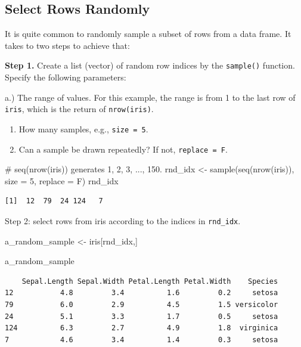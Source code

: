 \documentclass[
  letterpaper,
]{book}
\newenvironment{Shaded}{\begin{snugshade}}{\end{snugshade}}
\newcommand{\AttributeTok}[1]{\textcolor[rgb]{0.40,0.45,0.13}{#1}}
\newcommand{\CommentTok}[1]{\textcolor[rgb]{0.37,0.37,0.37}{#1}}
\newcommand{\DecValTok}[1]{\textcolor[rgb]{0.68,0.00,0.00}{#1}}
\newcommand{\FunctionTok}[1]{\textcolor[rgb]{0.28,0.35,0.67}{#1}}
\newcommand{\NormalTok}[1]{\textcolor[rgb]{0.00,0.23,0.31}{#1}}
\newcommand{\OtherTok}[1]{\textcolor[rgb]{0.00,0.23,0.31}{#1}}
\begin{document}
\subsection{Select Rows Randomly}\label{select-rows-randomly}

It is quite common to randomly sample a subset of rows from a data
frame. It takes to two steps to achieve that:

\textbf{Step 1.} Create a list (vector) of random row indices by the
\texttt{sample()} function. Specify the following parameters:

a.) The range of values. For this example, the range is from 1 to the
last row of \texttt{iris}, which is the return of \texttt{nrow(iris)}.

\begin{enumerate}
\def\labelenumi{\alph{enumi})}
\setcounter{enumi}{1}
\item
  How many samples, e.g., \texttt{size\ =\ 5}.
\item
  Can a sample be drawn repeatedly? If not, \texttt{replace\ =\ F}.
\end{enumerate}

\begin{Shaded}
\begin{Highlighting}[]
\CommentTok{\# seq(nrow(iris)) generates 1, 2, 3, ..., 150.}
\NormalTok{rnd\_idx }\OtherTok{\textless{}{-}} \FunctionTok{sample}\NormalTok{(}\FunctionTok{seq}\NormalTok{(}\FunctionTok{nrow}\NormalTok{(iris)), }\AttributeTok{size =} \DecValTok{5}\NormalTok{, }\AttributeTok{replace =}\NormalTok{ F)}
\NormalTok{rnd\_idx}
\end{Highlighting}
\end{Shaded}

\begin{verbatim}
[1]  12  79  24 124   7
\end{verbatim}

Step 2: select rows from iris according to the indices in
\texttt{rnd\_idx}.

\begin{Shaded}
\begin{Highlighting}[]
\NormalTok{a\_random\_sample }\OtherTok{\textless{}{-}}\NormalTok{ iris[rnd\_idx,]}

\NormalTok{a\_random\_sample}
\end{Highlighting}
\end{Shaded}

\begin{verbatim}
    Sepal.Length Sepal.Width Petal.Length Petal.Width    Species
12           4.8         3.4          1.6         0.2     setosa
79           6.0         2.9          4.5         1.5 versicolor
24           5.1         3.3          1.7         0.5     setosa
124          6.3         2.7          4.9         1.8  virginica
7            4.6         3.4          1.4         0.3     setosa
\end{verbatim}
\end{document}
